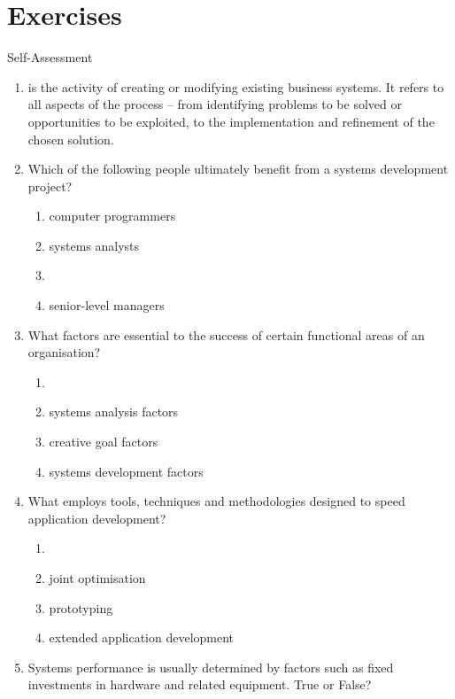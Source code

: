 \documentclass[\main/notes.tex]{subfiles}
\begin{document}
		\section{Exercises}
			\begin{exercise}{Self-Assessment}
				\begin{enumerate}
					\item {} is the activity of creating or modifying existing business systems. It refers to all aspects of the process -- from identifying problems to be solved or opportunities to be exploited, to the implementation and refinement of the chosen solution.
					\item Which of the following people ultimately benefit from a systems development project?
						\begin{enumerate}[label=\alph*., nosep]
							\item computer programmers
							\item systems analysts
							\item[\refstepcounter{enumii}\Circled{\alph{enumii}}] 
							\item senior-level managers
						\end{enumerate}
					\item What factors are essential to the success of certain functional areas of an organisation?
						\begin{enumerate}[label=\alph*., nosep]
							\item[\refstepcounter{enumii}\Circled{\alph{enumii}}] 
							\item systems analysis factors
							\item creative goal factors
							\item systems development factors 
						\end{enumerate}
					\item What employs tools, techniques and methodologies designed to speed application development?
						\begin{enumerate}[label=\alph*., nosep]
							\item[\refstepcounter{enumii}\Circled{\alph{enumii}}] 
							\item joint optimisation
							\item prototyping
							\item extended application development
						\end{enumerate}
					\item Systems performance is usually determined by factors such as fixed investments in hardware and related equipment. True or False? 

\end{enumerate}
\end{exercise}
\end{document}
